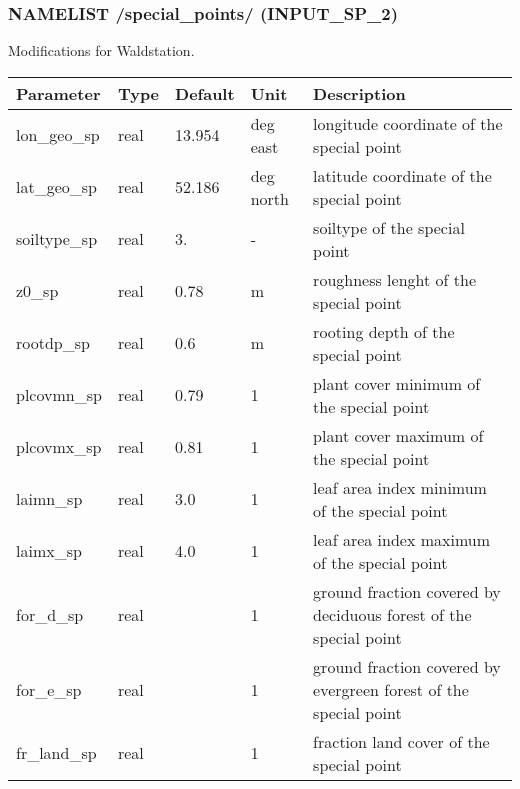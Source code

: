 \documentclass[a4paper,10pt,DIV14,BCOR1cm,titlepage,twoside]{scrartcl}
\providecommand{\tabularnewline}{\\}
\begin{document}
\subsubsection*{NAMELIST /special\_points/ (INPUT\_SP\_2)}
Modifications for Waldstation.\\
\begin{longtable}{|p{4cm}|p{1.5cm}|p{1.5cm}|p{1cm}|p{6cm}|}
\hline 
\textbf{Parameter}& \textbf{Type}& \textbf{Default}& \textbf{Unit}& \textbf{Description}
\tabularnewline
\hline
\endhead
\hline 
lon\_geo\_sp & real & 13.954 & deg east & longitude coordinate of the special point\tabularnewline\hline
lat\_geo\_sp & real & 52.186 & deg north & latitude coordinate of the special point\tabularnewline\hline
soiltype\_sp & real & 3. & - & soiltype of the special point\tabularnewline\hline
z0\_sp & real & 0.78 & m & roughness lenght of the special point\tabularnewline\hline
rootdp\_sp & real & 0.6 & m & rooting depth of the special point\tabularnewline\hline
plcovmn\_sp & real & 0.79 & 1 & plant cover minimum of the special point\tabularnewline\hline
plcovmx\_sp & real & 0.81 & 1 &plant cover maximum of the special point\tabularnewline\hline
laimn\_sp & real & 3.0 & 1 & leaf area index minimum of the special point\tabularnewline\hline
laimx\_sp & real & 4.0 & 1 &leaf area index maximum of the special point\tabularnewline\hline
for\_d\_sp & real & & 1 & ground fraction covered by deciduous forest of the special point\tabularnewline\hline
for\_e\_sp & real & & 1 & ground fraction covered by evergreen forest of the special point\tabularnewline\hline
fr\_land\_sp & real & & 1 & fraction land cover of the special point\tabularnewline\hline
\bottomrule
\end{longtable}
\end{document}
